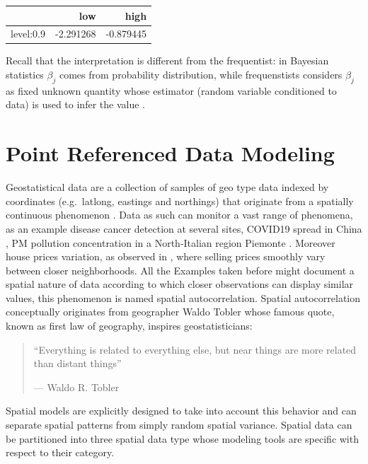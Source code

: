 \documentclass[
  12pt,
  a4paper,
  oneside]{book}
\theoremstyle{definition}
\theoremstyle{definition}
\theoremstyle{definition}
\theoremstyle{remark}
\begin{document}
\begin{tabular}{lrr}
\toprule
  & low & high\\
\midrule
level:0.9 & -2.291268 & -0.879445\\
\bottomrule
\end{tabular}

Recall that the interpretation is different from the frequentist: in Bayesian statistics \(\beta_{j}\) comes from probability distribution, while frequenstists considers \(\beta_{j}\) as fixed unknown quantity whose estimator (random variable conditioned to data) is used to infer the value \citeyearpar{Blangiardo-Cameletti}.

\hypertarget{prdm}{%
\chapter{Point Referenced Data Modeling}\label{prdm}}

Geostatistical data are a collection of samples of geo type data indexed by coordinates (e.g.~latlong, eastings and northings) that originate from a spatially continuous phenomenon \citep{Moraga2019}. Data as such can monitor a vast range of phenomena, as an example disease cancer detection \citep{Bell2006} at several sites, COVID19 spread in China \citep{Li_Li_Ding_Hu_Chen_Wang_Peng_Shen_2020}, PM pollution concentration in a North-Italian region Piemonte \citep{Cameletti2012}. Moreover house prices variation, as observed in \citet{Bayesian_INLA_Rubio}, where selling prices smoothly vary between closer neighborhoods. All the Examples taken before might document a spatial nature of data according to which closer observations can display similar values, this phenomenon is named spatial autocorrelation. Spatial autocorrelation conceptually originates from geographer Waldo Tobler whose famous quote, known as first law of geography, inspires geostatisticians:

\begin{quote}
``Everything is related to everything else,
but near things are more related than distant things''

\hfill --- Waldo R. Tobler
\end{quote}

Spatial models are explicitly designed to take into account this behavior and can separate spatial patterns from simply random spatial variance.
Spatial data can be partitioned into three spatial data type whose modeling tools are specific with respect to their category.
\end{document}
